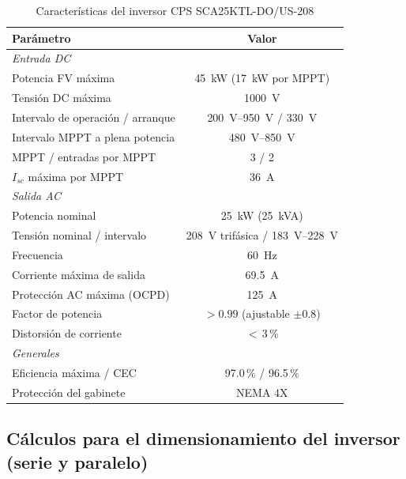 \begin{table}[!htb]
\caption{Características del inversor CPS SCA25KTL-DO/US-208 \cite{cps_ds}}
\label{tab:inversor}
\centering
\footnotesize
\setlength{\tabcolsep}{3pt}
\begin{tabular}{l c}
\toprule
Parámetro & Valor \\
\midrule
\multicolumn{2}{l}{\textit{Entrada DC}} \\
Potencia FV máxima & \SI{45}{kW} (\SI{17}{kW} por MPPT) \\
Tensión DC máxima & \SI{1000}{V} \\
Intervalo de operación / arranque & \SIrange{200}{950}{V} / \SI{330}{V} \\
Intervalo MPPT a plena potencia & \SIrange{480}{850}{V} \\
MPPT / entradas por MPPT & 3 / 2 \\
$I_{sc}$ máxima por MPPT & \SI{36}{A} \\
\multicolumn{2}{l}{\textit{Salida AC}} \\
Potencia nominal & \SI{25}{kW} (\SI{25}{kVA}) \\
Tensión nominal / intervalo & \SI{208}{V} trifásica / \SIrange{183}{228}{V} \\
Frecuencia & \SI{60}{Hz} \\
Corriente máxima de salida & \SI{69.5}{A} \\
Protección AC máxima (OCPD) & \SI{125}{A} \\
Factor de potencia & $>0.99$ (ajustable $\pm 0.8$) \\
Distorsión de corriente & $<$\,3\,\% \\
\multicolumn{2}{l}{\textit{Generales}} \\
Eficiencia máxima / CEC & 97.0\,\% / 96.5\,\% \\
Protección del gabinete & NEMA 4X \\
\bottomrule
\end{tabular}
\end{table}

\subsection{Cálculos para el dimensionamiento del inversor (serie y paralelo)}\label{sec:serie}

